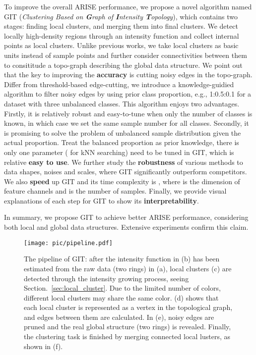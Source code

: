 \documentclass[letterpaper]{article} \usepackage{aaai22}  \usepackage{times}  \usepackage{helvet}  \usepackage{courier}  \usepackage[hyphens]{url}  \usepackage{graphicx} \urlstyle{rm} \def\UrlFont{\rm}  \usepackage{natbib}  \usepackage{caption} \DeclareCaptionStyle{ruled}{labelfont=normalfont,labelsep=colon,strut=off} \frenchspacing  \setlength{\pdfpagewidth}{8.5in}  \setlength{\pdfpageheight}{11in}  \usepackage{subfigure}
\begin{document}
To improve the overall ARISE performance, we propose a novel algorithm named GIT (\textit{Clustering Based on \textbf{G}raph of \textbf{I}ntensity \textbf{T}opology}), which contains two stages: finding local clusters, and merging them into final clusters. We detect locally high-density regions through an intensity function and collect internal points as local clusters. Unlike previous works, we take local clusters as basic units instead of sample points and further consider connectivities between them to consititude a topo-graph describing the global data structure. We point out that the key to improving the \textbf{accuracy} is cutting noisy edges in the topo-graph. Differ from threshold-based edge-cutting, we introduce a knowledge-guidied algorithm to filter noisy edges by using prior class proportion, e.g., 1:0.5:0.1 for a dataset with three unbalanced classes. This algorithm enjoys two advantages. Firstly, it is relatively robust and easy-to-tune when only the number of classes is known, in which case we set the same sample number for all classes. Secondly, it is promising to solve the problem of unbalanced sample distribution given the actual proportion. Treat the balanced proportion as prior knowledge, there is only one parameter ( for kNN searching) need to be tuned in GIT, which is relative \textbf{easy to use}. We further study the \textbf{robustness} of various methods to data shapes, noises and scales, where GIT significantly outperform competitors. We also \textbf{speed} up GIT and its time complexity is , where  is the dimension of feature channels and  is the number of samples. Finally, we provide visual explanations of each step for GIT to show its \textbf{interpretability}. 


In summary, we propose GIT to achieve better ARISE performance, considering both local and global data structures. Extensive experiments confirm this claim.



\begin{figure*}[ht]
	\centering
	    \texttt{[image: pic/pipeline.pdf]}
	    \caption{The pipeline of GIT: after the intensity function in (b) has been estimated from the raw data (two rings) in (a), local clusters (c) are detected through the intensity growing process, seeing Section.~\ref{sec:local_cluster}. Due to the limited number of colors, different local clusters may share the same color. (d) shows that each local cluster is represented as a vertex in the topological graph, and edges between them are calculated. In (e), noisy edges are pruned and the real global structure (two rings) is revealed. Finally, the clustering task is finished by merging connected local lusters, as shown in (f).}
	    \label{fig:pipeline}
\end{figure*}
\end{document}
